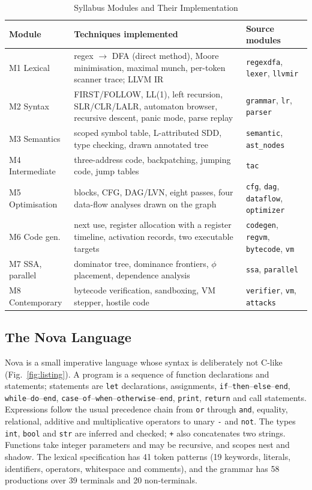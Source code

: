 \documentclass[conference]{IEEEtran}
\newcommand{\code}[1]{\texttt{#1}}
\begin{document}
\begin{table}[!tbp]
\caption{Syllabus Modules and Their Implementation}
\label{tab:syllabus}
\centering
\footnotesize
\setlength{\tabcolsep}{3pt}
\renewcommand{\arraystretch}{1.08}
\begin{tabular}{@{}l L{3.3cm} L{2.3cm}@{}}
\toprule
Module & Techniques implemented & Source modules \\
\midrule
M1 Lexical & regex $\to$ DFA (direct method), Moore minimisation, maximal munch, per-token scanner trace; LLVM IR & \code{regexdfa}, \code{lexer}, \code{llvmir} \\
M2 Syntax & FIRST/FOLLOW, LL(1), left recursion, SLR/CLR/LALR, automaton browser, recursive descent, panic mode, parse replay & \code{grammar}, \code{lr}, \code{parser} \\
M3 Semantics & scoped symbol table, L-attributed SDD, type checking, drawn annotated tree & \code{semantic}, \code{ast\_nodes} \\
M4 Intermediate & three-address code, backpatching, jumping code, jump tables & \code{tac} \\
M5 Optimisation & blocks, CFG, DAG/LVN, eight passes, four data-flow analyses drawn on the graph & \code{cfg}, \code{dag}, \code{dataflow}, \code{optimizer} \\
M6 Code gen. & next use, register allocation with a register timeline, activation records, two executable targets & \code{codegen}, \code{regvm}, \code{bytecode}, \code{vm} \\
M7 SSA, parallel & dominator tree, dominance frontiers, $\phi$ placement, dependence analysis & \code{ssa}, \code{parallel} \\
M8 Contemporary & bytecode verification, sandboxing, VM stepper, hostile code & \code{verifier}, \code{vm}, \code{attacks} \\
\bottomrule
\end{tabular}
\end{table}

\subsection{The Nova Language}
Nova is a small imperative language whose syntax is deliberately not C-like (Fig.~\ref{fig:listing}). A program is a sequence of function declarations and statements; statements are \code{let} declarations, assignments, \code{if}--\code{then}--\code{else}--\code{end}, \code{while}--\code{do}--\code{end}, \code{case}--\code{of}--\code{when}--\code{otherwise}--\code{end}, \code{print}, \code{return} and call statements. Expressions follow the usual precedence chain from \code{or} through \code{and}, equality, relational, additive and multiplicative operators to unary \code{-} and \code{not}. The types \code{int}, \code{bool} and \code{str} are inferred and checked; \code{+} also concatenates two strings. Functions take integer parameters and may be recursive, and scopes nest and shadow. The lexical specification has 41 token patterns (19 keywords, literals, identifiers, operators, whitespace and comments), and the grammar has 58 productions over 39 terminals and 20 non-terminals.
\end{document}
